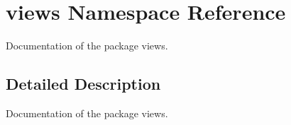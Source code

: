 \hypertarget{namespaceviews}{}\section{views Namespace Reference}
\label{namespaceviews}


Documentation of the package views.  




\subsection{Detailed Description}
Documentation of the package views. 